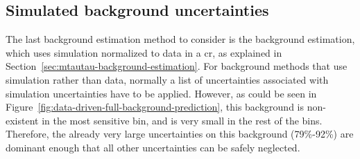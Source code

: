 \subsection{Simulated background uncertainties}
\label{simulated-background-uncertainties}

The last background estimation method to consider is the \tautau background estimation, which uses simulation normalized to data in a \gls{cr}, as explained in Section~\ref{sec:mtautau-background-estimation}. For background methods that use simulation rather than data, normally a list of uncertainties associated with simulation uncertainties have to be applied. However, as could be seen in Figure~\ref{fig:data-driven-full-background-prediction}, this background is non-existent in the most sensitive bin, and is very small in the rest of the bins. Therefore, the already very large uncertainties on this background (79\%-92\%) are dominant enough that all other uncertainties can be safely neglected.

